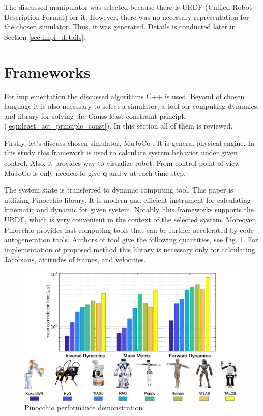 The discussed manipulator was selected because there is URDF (Unified Robot 
Description Format) for it. However, there was no necessary representation for the 
chosen simulator. Thus, it was generated. Details is conducted later 
in Section \ref{sec:impl_details}.

\section{Frameworks}
\label{sec:frameworks}

For implementation the discussed algorithms C++ is used. Beyond of chosen language 
it is also necessary to select a simulator, a tool for computing dynamics, and 
library for solving the Gauss least constraint principle 
(\ref{eqn:least_act_principle_const}). In this section all of them is reviewed.

Firstly, let's discuss chosen simulator, MuJoCo \cite{MuJoCo}. It is general 
physical engine. In this study this framework is used to calculate system 
behavior under given control. Also, it provides way to visualize robot. From 
control point of view MuJoCo is only needed to give $\mathbf{q}$ and $\mathbf{v}$ 
at each time step. 

The system state is transferred to dynamic computing tool. This paper is utilizing 
Pinocchio \cite{Pinocchio} library. It is modern and efficient instrument for 
calculating kinematic and dynamic for given system. Notably, this frameworks 
supports the URDF, which is very convenient in the context of the selected system. 
Moreover, Pinocchio provides fast computing tools that can be further accelerated 
by code autogeneration tools. Authors of tool give the following quantities, see 
Fig. \ref{fig:pin_speed}. For implementation of proposed method this library is 
necessary only for calculating Jacobians, attitudes of frames, and velocities.

\begin{figure}[H]
    \centering
    \includegraphics[scale=0.2]{figs/pin_speed.png}
    \caption{Pinocchio performance demonstration}
    \label{fig:pin_speed}
\end{figure}

